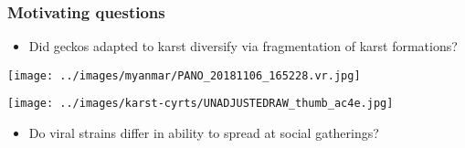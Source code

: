 \begin{frame}[t]
    \frametitle{Motivating questions}


    \vspace{-4mm}
    \begin{minipage}[t][\frametextheight][t]{\textwidth}
        \begin{minipage}[t][\frametextheight][t]{0.54\textwidth}
            \begin{itemize}
                \item<1-> Did geckos adapted to karst diversify via fragmentation of karst formations?
            \end{itemize}
            \vspace{-3.5mm}
            \begin{center}
                \texttt{[image: ../images/myanmar/PANO\_20181106\_165228.vr.jpg]}

                \smallskip
                \texttt{[image: ../images/karst-cyrts/UNADJUSTEDRAW\_thumb\_ac4e.jpg]}
            \end{center}
        \end{minipage}
        \begin{minipage}[t][\frametextheight][t]{0.45\textwidth}
            \begin{itemize}
                \item<2-> Do viral strains differ in ability to spread at social gatherings?
            \end{itemize}

            \vspace{9mm}
            \begin{center}
                

\end{center}
\end{minipage}
\end{minipage}
\end{frame}
